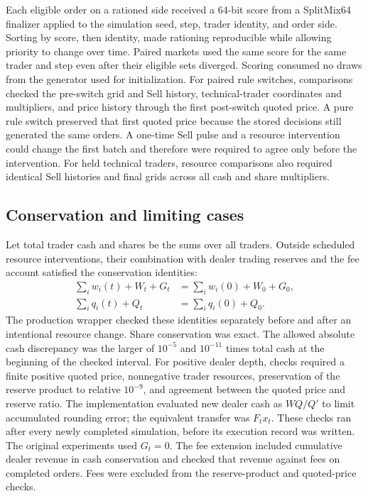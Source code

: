 Each eligible order on a rationed side received a 64-bit score from a
SplitMix64 finalizer applied to the simulation seed, step, trader identity,
and order side. Sorting by score, then identity, made rationing reproducible
while allowing priority to change over time. Paired markets used the same
score for the same trader and step even after their eligible sets diverged.
Scoring consumed no draws from the generator used for initialization.
For paired rule switches, comparisons checked the pre-switch grid and Sell
history, technical-trader coordinates and multipliers, and price history
through the first post-switch quoted price. A pure rule switch preserved
that first quoted price because the stored decisions still generated the
same orders.
A one-time Sell pulse and a resource intervention could change the first
batch and therefore were required to agree only before the intervention.
For held technical traders, resource comparisons also required identical
Sell histories and final grids across all cash and share multipliers.

\subsection{Conservation and limiting cases}

Let total trader cash and shares be the sums over all traders. Outside
scheduled resource interventions, their combination with dealer trading
reserves and the fee account
satisfied the conservation identities:
\begin{align*}
 \sum_i w_i(t)+W_t+G_t&=\sum_i w_i(0)+W_0+G_0,\\
 \sum_i q_i(t)+Q_t&=\sum_i q_i(0)+Q_0.
\end{align*}
The production wrapper checked these identities separately before and
after an intentional resource change. Share conservation was exact.
The allowed absolute cash discrepancy was the larger of $10^{-5}$ and
$10^{-11}$ times total cash at the beginning of the checked interval.
For positive dealer depth, checks required a finite positive quoted
price, nonnegative
trader resources, preservation of the reserve product to relative
$10^{-9}$, and agreement between the quoted price and reserve ratio.
The implementation evaluated new dealer cash as $WQ/Q'$ to limit
accumulated rounding error; the equivalent transfer was $F_tx_t$.
These checks ran after every newly completed simulation, before its
execution record was written. The original experiments used $G_t=0$.
The fee extension included cumulative dealer revenue in cash conservation
and checked that revenue against fees on completed orders. Fees were
excluded from the reserve-product and quoted-price checks.

